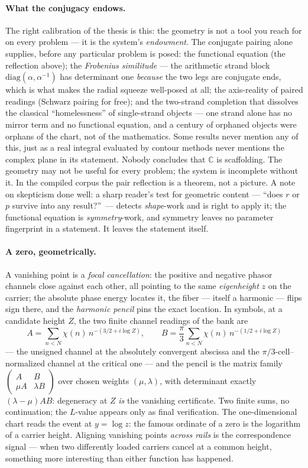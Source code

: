 \documentclass[11pt]{article}
\begin{document}
\paragraph{What the conjugacy endows.}  The right calibration of the thesis is
this: the geometry is not a tool you reach for on every problem --- it is the
system's \emph{endowment}.  The conjugate pairing alone supplies, before any
particular problem is posed: the functional equation (the reflection above);
the \emph{Frobenius similitude} --- the arithmetic strand block
$\mathrm{diag}(\alpha,\alpha^{-1})$ has determinant one \emph{because} the two
legs are conjugate ends, which is what makes the radial squeeze well-posed at
all; the axis-reality of paired readings (Schwarz pairing for free); and the
two-strand completion that dissolves the classical ``homelessness'' of
single-strand objects --- one strand alone has no mirror term and no functional
equation, and a century of orphaned objects were orphans of the chart, not of
the mathematics.  Some results never mention any of this, just as a real
integral evaluated by contour methods never mentions the complex plane in its
statement.  Nobody concludes that $\mathbb C$ is scaffolding.  The geometry may
not be useful for every problem; the system is incomplete without it.  In the compiled corpus
the pair reflection is a theorem, not a picture.  A note on skepticism done
well: a sharp reader's test for geometric content --- ``does $r$ or $p$ survive
into any result?''\ --- detects \emph{shape}-work and is right to apply it; the
functional equation is \emph{symmetry}-work, and symmetry leaves no parameter
fingerprint in a statement.  It leaves the statement itself.

\paragraph{A zero, geometrically.}  A vanishing point is a \emph{focal
cancellation}: the positive and negative phasor channels close against each
other, all pointing to the same \emph{eigenheight} $z$ on the carrier; the
absolute phase energy locates it, the fiber --- itself a harmonic --- flips
sign there, and the \emph{harmonic pencil} pins the exact location.  In
symbols, at a candidate height $Z$, the two finite channel readings of the bank
are
\[
A=\sum_{n<N}\chi(n)\,n^{-(3/2+i\log Z)},\qquad
B=\frac{\pi}{3}\sum_{n<N}\chi(n)\,n^{-(1/2+i\log Z)}
\]
--- the unsigned channel at the absolutely convergent abscissa and the
$\pi/3$-cell--normalized channel at the critical one --- and the pencil is the
matrix family $\begin{pmatrix}A&B\\ \mu A&\lambda B\end{pmatrix}$ over chosen
weights $(\mu,\lambda)$, with determinant exactly $(\lambda-\mu)AB$: degeneracy
at $Z$ \emph{is} the vanishing certificate.  Two finite sums, no continuation;
the $L$-value appears only as final verification.  The
one-dimensional chart reads the event at $y=\log z$: the famous ordinate of a
zero is the logarithm of a carrier height.  Aligning vanishing points
\emph{across rails} is the correspondence signal --- when two differently
loaded carriers cancel at a common height, something more interesting than
either function has happened.
\end{document}
